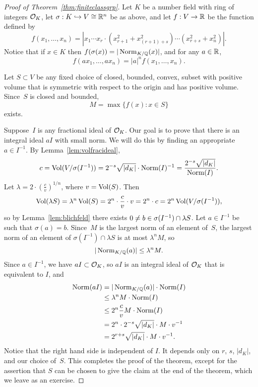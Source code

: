 \begin{proof}[Proof of Theorem~\ref{thm:finiteclassgrp}]
Let $K$ be a number field with ring of integers $\mathcal{O}_K$,
let $\sigma:K\hookrightarrow V\cong \mathbb{R}^n$ be as above,
and let $f:V\to \mathbb{R}$ be the function defined by
\[
  f(x_1,\ldots, x_n) = |x_1\cdots x_r\cdot (x_{r+1}^2 + x_{(r+1)+s}^2)\cdots (x_{r+s}^2 + x_n^2)|.
\]
Notice that if $x\in K$ then $f(\sigma(x)) = |\operatorname{Norm}_{K/\mathbb{Q}}(x)|$,
and for any $a\in \mathbb{R}$, 
 $$
  f(ax_1, \ldots,  ax_n) = |a|^n f(x_1,\ldots, x_n).
$$

Let $S\subset V$ be any fixed choice of closed, bounded, convex, subset with
positive volume that is
symmetric with respect to the origin and has positive volume.  Since~$S$ is closed
and bounded, 
\[
  M = \max\{f(x) : x \in S\}
\]
exists. 

Suppose~$I$ is any  fractional ideal of $\mathcal{O}_K$.  Our goal
is to prove that there is an integral ideal $aI$ with small norm. We
will do this by finding an appropriate $a\in I^{-1}$.
By Lemma~\ref{lem:volfracideal}, 
\[
 c=\operatorname{Vol}(V/\sigma(I^{-1})) = 2^{-s}\sqrt{|d_K|}\cdot \operatorname{Norm}(I)^{-1} 
        = \frac{2^{-s} \sqrt{|d_K|}}{\operatorname{Norm}(I)}.
\]
Let $\lambda = 2\cdot\left(\frac{c}{v}\right)^{1/n}$, where $v=\operatorname{Vol}(S)$.
Then 
\[
   \operatorname{Vol}(\lambda{} S) = \lambda^n \operatorname{Vol}(S) = 2^n\cdot \frac{c}{v} \cdot v = 2^n\cdot c=
  2^n \operatorname{Vol}(V/\sigma(I^{-1})),
\]
so by Lemma~\ref{lem:blichfeld} there exists 
$0\neq b\in \sigma(I^{-1})\cap \lambda S$.
Let $a \in I^{-1}$ be such that $\sigma(a)=b$.
Since~$M$ is the largest norm of an element of~$S$, the largest norm
of an element of $\sigma(I^{-1})\cap  \lambda{}S$ is at most $\lambda^n M$,
so 
\[
  |\operatorname{Norm}_{K/\mathbb{Q}}(a)| \leq \lambda^n M.
\]
Since $a\in I^{-1}$, we have $aI \subset \mathcal{O}_K$, so 
$aI$ is an integral ideal of $\mathcal{O}_K$ that is equivalent to $I$, and
\begin{align*}
  \operatorname{Norm}(aI) &= |\operatorname{Norm}_{K/\mathbb{Q}}(a)|\cdot \operatorname{Norm}(I)\\
    &\leq \lambda^n M\cdot \operatorname{Norm}(I)\\
    &\leq 2^n \frac{c}{v} M \cdot \operatorname{Norm}(I)\\
    &= 2^n\cdot 2^{-s} \sqrt{|d_K|} \cdot M \cdot v^{-1}\\
    &= 2^{r+s} \sqrt{|d_K|} \cdot M \cdot v^{-1}.
\end{align*}
Notice that the right hand side is independent of $I$.  It
depends only on $r$, $s$, $|d_K|$, and our choice of~$S$.
This completes the proof of the theorem, except for
the assertion that $S$ can be chosen to give the claim
at the end of the theorem, which we leave as an exercise.
\end{proof}

